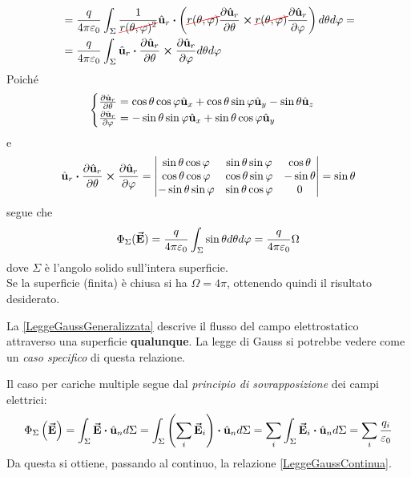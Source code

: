 \begin{demonstration}
\begin{align*}
	&=\frac{q}{4\pi\epsilon_0}\int_{\Sigma}\frac{1}{\Ccancel[red]{r(\theta,\phi)^2}}\vbh{u}_r\vdot\left(\Ccancel[red]{r(\theta,\phi)}\pdv{\vbh{u}_r}{\theta}\cross \Ccancel[red]{r(\theta,\phi)}\pdv{\vbh{u}_r}{\phi}\right)d\theta d\phi=\\
	&=\frac{q}{4\pi\epsilon_0}\int_{\Sigma}\vbh{u}_r\vdot\pdv{\vbh{u}_r}{\theta}\cross\pdv{\vbh{u}_r}{\phi}d\theta d\phi
\end{align*}
Poiché
\begin{equation*}
	\begin{cases}
		\pdv{\hat{\mathbf{u}}_r}{\theta}=\cos\theta\cos\varphi\hat{\mathbf{u}}_x+\cos\theta\sin\varphi\hat{\mathbf{u}}_y-\sin\theta\hat{\mathbf{u}}_z\\
		\pdv{\hat{\mathbf{u}}_r}{\varphi}=-\sin\theta\sin\varphi\hat{\mathbf{u}}_x+\sin\theta\cos\varphi\hat{\mathbf{u}}_y\\
\end{cases}
\end{equation*}
e
\begin{equation*}
	\vbh{u}_r\vdot\pdv{\vbh{u}_r}{\theta}\cross\pdv{\vbh{u}_r}{\phi}=\begin{vmatrix}
		\sin\theta\cos\phi & \sin\theta\sin\phi & \cos\theta\\
		\cos\theta\cos\phi & \cos\theta\sin\phi & -\sin\theta\\
		-\sin\theta\sin\phi & \sin\theta\cos\phi & 0
	\end{vmatrix}=\sin\theta
\end{equation*}
segue che
\begin{equation}
	\Phi_{\Sigma}(\vb*{\va{E}})=\frac{q}{4\pi\varepsilon_0}\int_{\Sigma}\sin\theta d\theta d\varphi=\frac{q}{4\pi\varepsilon_0}\Omega\label{LeggeGaussGeneralizzata}
\end{equation}
dove $\Sigma$ è l'angolo solido sull'intera superficie.\\
Se la superficie (finita) è chiusa si ha $\Omega=4\pi$, ottenendo quindi il risultato desiderato.
\end{demonstration}
\begin{observe}
	La \ref{LeggeGaussGeneralizzata} descrive il flusso del campo elettrostatico attraverso una superficie \textbf{qualunque}. La legge di Gauss si potrebbe vedere come un \textit{caso specifico} di questa relazione.
\end{observe}
Il caso per cariche multiple segue dal \textit{principio di sovrapposizione} dei campi elettrici:
\begin{equation*}
	\Phi_{\Sigma}\left(\vba{E}\right)=\int_{\Sigma} \vba{E}\vdot \vbh{u}_nd\Sigma=\int_{\Sigma}\left(\sum_i\vba{E}_i\right)\vdot\vbh{u}_nd\Sigma=\sum_i\int_{\Sigma}\vba{E}_i\vdot\vbh{u}_nd\Sigma=\sum_i\frac{q_i}{\epsilon_0}
\end{equation*}
Da questa si ottiene, passando al continuo, la relazione \ref{LeggeGaussContinua}.
